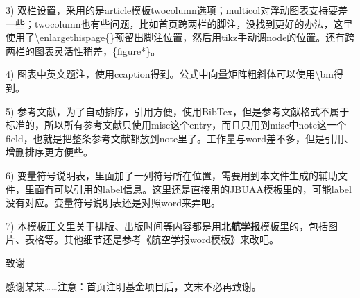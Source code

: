 \documentclass[10.5pt,twocolumn]{aaas}
\newcommand\mycolorRed[1]{{\color{red}#1}}
\begin{document}
3) \mycolorRed{双栏}设置，采用的是article模板twocolumn选项；multicol对浮动图表支持要差一些；twocolumn也有些问题，比如首页跨两栏的脚注，没找到更好的办法，这里使用了\textbackslash enlargethispage\{\}预留出脚注位置，然后用tikz手动调node的位置。还有跨两栏的图表灵活性稍差，\{figure*\}。

4) 图表中英文题注，使用ccaption得到。公式中向量矩阵粗斜体可以使用\textbackslash bm得到。

5) 参考文献，为了自动排序，引用方便，使用BibTex，但是参考文献格式不属于标准的，所以所有参考文献只使用misc这个entry，而且只用到misc中note这一个field，也就是把整条参考文献都放到note里了。工作量与word差不多，但是引用、增删排序更方便些。

6) 变量符号说明表，里面加了一列符号所在位置，需要用到本文件生成的辅助文件，里面有可以引用的label信息。这里还是直接用的JBUAA模板里的，可能label没有对应。变量符号说明表还是对照word来弄吧。

7) \mycolorRed{本模板正文里关于排版、出版时间等内容都是用\textbf{北航学报}模板里的，包括图片、表格等。其他细节还是参考《航空学报word模板》来改吧。}

\vspace{1em}
{\noindent\xiaosihao 致\quad 谢}

\vspace{1em}
{\wuhao
  感谢某某……注意：首页注明基金项目后，文末不必再致谢。
}




\renewcommand\refname{\hei\wuhao\centerline{参\quad 考\quad 文\quad 献（20条以上）}\global\def\refname{参考文献}}
\vskip 12pt

\let\OLDthebibliography\thebibliography
\renewcommand\thebibliography[1]{
  \OLDthebibliography{#1}
  \setlength{\parskip}{0pt}
  \setlength{\itemsep}{0pt plus 0.3ex}
}

{
  \renewcommand{\baselinestretch}{0.9}
  \liuhao
  
  
}



% 
% 
% 
\end{document}
